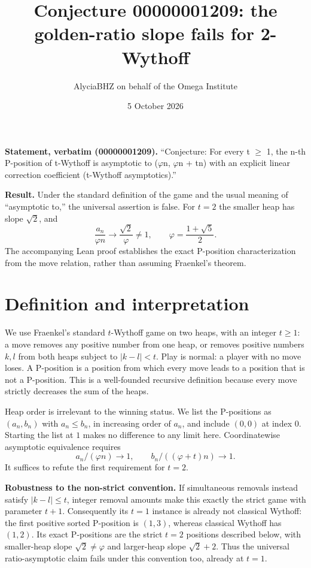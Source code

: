 \documentclass[11pt]{article}
\title{Conjecture 00000001209: the golden-ratio slope fails for 2-Wythoff}
\author{AlyciaBHZ on behalf of the Omega Institute}
\date{5 October 2026}
\begin{document}
\maketitle

\textbf{Statement, verbatim (00000001209).}
``Conjecture: For every t $\geq$ 1, the n-th P-position of t-Wythoff is asymptotic to ($\varphi$n, $\varphi$n + tn) with an explicit linear correction coefficient (t-Wythoff asymptotics).''

\textbf{Result.} Under the standard definition of the game and the usual meaning of ``asymptotic to,'' the universal assertion is false. For $t=2$ the smaller heap has slope $\sqrt2$, and
\[
\frac{a_n}{\varphi n}\longrightarrow\frac{\sqrt2}{\varphi}\ne1,
\qquad \varphi=\frac{1+\sqrt5}{2}.
\]
The accompanying Lean proof establishes the exact P-position characterization from the move relation, rather than assuming Fraenkel's theorem.

\section{Definition and interpretation}
We use Fraenkel's standard $t$-Wythoff game on two heaps, with an integer $t\ge1$: a move removes any positive number from one heap, or removes positive numbers $k,l$ from both heaps subject to $|k-l|<t$. Play is normal: a player with no move loses. A P-position is a position from which every move leads to a position that is not a P-position. This is a well-founded recursive definition because every move strictly decreases the sum of the heaps.

Heap order is irrelevant to the winning status. We list the P-positions as $(a_n,b_n)$ with $a_n\le b_n$, in increasing order of $a_n$, and include $(0,0)$ at index $0$. Starting the list at $1$ makes no difference to any limit here. Coordinatewise asymptotic equivalence requires
\[
a_n/(\varphi n)\to1,\qquad b_n/((\varphi+ t)n)\to1.
\]
It suffices to refute the first requirement for $t=2$.

\textbf{Robustness to the non-strict convention.}
If simultaneous removals instead satisfy $|k-l|\le t$, integer removal
amounts make this exactly the strict game with parameter $t+1$.
Consequently its $t=1$ instance is already not classical Wythoff: the
first positive sorted P-position is $(1,3)$, whereas classical Wythoff
has $(1,2)$. Its exact P-positions are the strict $t=2$ positions described
below, with smaller-heap slope $\sqrt2\ne\varphi$ and larger-heap slope
$\sqrt2+2$. Thus the universal ratio-asymptotic claim fails under this
convention too, already at $t=1$.
\end{document}

